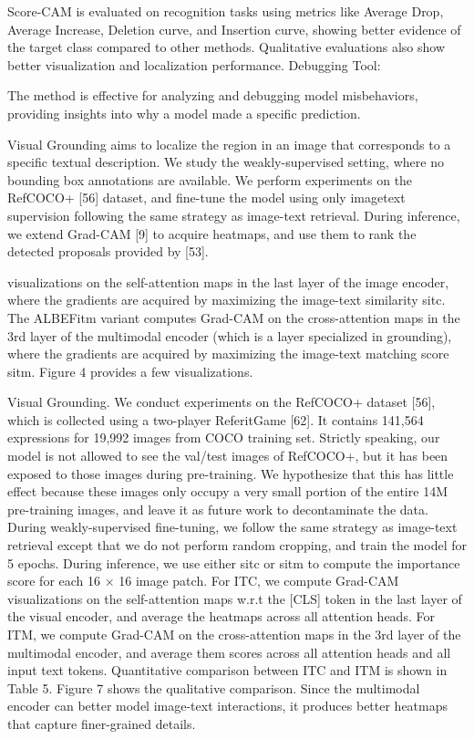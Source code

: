 Score-CAM is evaluated on recognition tasks using metrics like Average Drop, Average Increase, Deletion curve, and Insertion curve, showing better evidence of the target class compared to other methods.
Qualitative evaluations also show better visualization and localization performance.
Debugging Tool:

The method is effective for analyzing and debugging model misbehaviors, providing insights into why a model made a specific prediction.



Visual Grounding aims to localize the region in an image that corresponds to a specific textual description. We study the weakly-supervised setting, where no bounding box annotations are available. We perform experiments on the RefCOCO+ [56] dataset, and fine-tune the model using only imagetext supervision following the same strategy as image-text retrieval. During inference, we extend Grad-CAM [9] to acquire heatmaps, and use them to rank the detected proposals provided by [53].

visualizations on the self-attention maps in the last layer of the image encoder, where the gradients are acquired by maximizing the image-text similarity sitc. The ALBEFitm variant computes Grad-CAM on the cross-attention maps in the 3rd layer of the multimodal encoder (which is a layer specialized in grounding), where the gradients are acquired by maximizing the image-text matching score sitm. Figure 4 provides a few visualizations.


Visual Grounding. We conduct experiments on the RefCOCO+ dataset [56], which is collected using a two-player ReferitGame [62]. It contains 141,564 expressions for 19,992 images from COCO training set. Strictly speaking, our model is not allowed to see the val/test images of RefCOCO+, but it has been exposed to those images during pre-training. We hypothesize that this has little effect because these images only occupy a very small portion of the entire 14M pre-training images, and leave it as future work to decontaminate the data. During weakly-supervised fine-tuning, we follow the same strategy as image-text retrieval except that we do not perform random cropping, and train the model for 5 epochs. During inference, we use either sitc or sitm to compute the importance score for each 16 × 16 image patch. For ITC, we compute Grad-CAM visualizations on the self-attention maps w.r.t the [CLS] token in the last layer of the visual encoder, and average the heatmaps across all attention heads. For ITM, we compute Grad-CAM on the cross-attention maps in the 3rd layer of the multimodal encoder, and average them scores across all attention heads and all input text tokens. Quantitative comparison between ITC and ITM is shown in Table 5. Figure 7 shows the qualitative comparison. Since the multimodal encoder can better model image-text interactions, it produces better heatmaps that capture finer-grained details.


